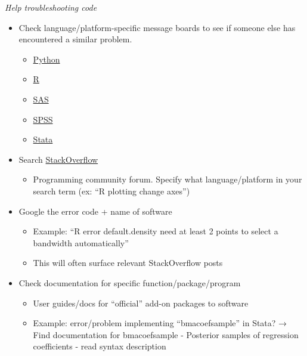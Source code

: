 \documentclass[
]{book}
\providecommand{\tightlist}{%
  \setlength{\itemsep}{0pt}\setlength{\parskip}{0pt}}
\begin{document}
\emph{Help troubleshooting code}

\begin{itemize}
\tightlist
\item
  Check language/platform-specific message boards to see if someone else has encountered a similar problem.

  \begin{itemize}
  \tightlist
  \item
    \href{https://discuss.python.org/c/help/7}{Python}
  \item
    \href{https://forum.posit.co/}{R}
  \item
    \href{https://communities.sas.com/}{SAS}
  \item
    \href{https://www.ibm.com/products/spss-statistics/support}{SPSS}
  \item
    \href{https://www.statalist.org/}{Stata}
  \end{itemize}
\item
  Search \href{https://stackoverflow.com/questions}{StackOverflow}

  \begin{itemize}
  \tightlist
  \item
    Programming community forum. Specify what language/platform in your search term (ex: ``R plotting change axes'')
  \end{itemize}
\item
  Google the error code + name of software

  \begin{itemize}
  \tightlist
  \item
    Example: ``R error default.density need at least 2 points to select a bandwidth automatically''
  \item
    This will often surface relevant StackOverflow posts\\
  \end{itemize}
\item
  Check documentation for specific function/package/program

  \begin{itemize}
  \tightlist
  \item
    User guides/docs for ``official'' add-on packages to software
  \item
    Example: error/problem implementing ``bmacoefsample'' in Stata? → Find documentation for bmacoefsample - Posterior samples of regression coefficients - read syntax description
  \end{itemize}
\end{itemize}

  
\end{document}
